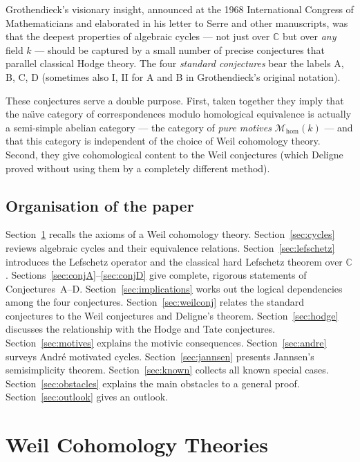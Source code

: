 \documentclass[12pt,a4paper]{amsart}
\theoremstyle{definition}
\begin{document}
Grothendieck's visionary insight, announced at the 1968 International Congress
of Mathematicians and elaborated in his letter to Serre and other manuscripts,
was that the deepest properties of algebraic cycles --- not just over
$\mathbb{C}$ but over \emph{any} field $k$ --- should be captured by a small
number of precise conjectures that parallel classical Hodge theory.
The four \emph{standard conjectures} bear the labels A, B, C, D (sometimes
also I, II for A and B in Grothendieck's original notation).

These conjectures serve a double purpose.  First, taken together they imply
that the na\"{\i}ve category of correspondences modulo homological equivalence
is actually a semi-simple abelian category --- the category of \emph{pure
motives} $\mathcal{M}_{\mathrm{hom}}(k)$ --- and that this category is
independent of the choice of Weil cohomology theory.  Second, they give
cohomological content to the Weil conjectures (which Deligne proved without
using them by a completely different method).

\subsection*{Organisation of the paper}

Section~\ref{sec:weil} recalls the axioms of a Weil cohomology theory.
Section~\ref{sec:cycles} reviews algebraic cycles and their equivalence
relations.  Section~\ref{sec:lefschetz} introduces the Lefschetz operator
and the classical hard Lefschetz theorem over $\mathbb{C}$.
Sections~\ref{sec:conjA}--\ref{sec:conjD} give complete, rigorous statements
of Conjectures~A--D.  Section~\ref{sec:implications} works out the
logical dependencies among the four conjectures.
Section~\ref{sec:weilconj} relates the standard conjectures to the Weil
conjectures and Deligne's theorem.  Section~\ref{sec:hodge} discusses the
relationship with the Hodge and Tate conjectures.
Section~\ref{sec:motives} explains the motivic consequences.
Section~\ref{sec:andre} surveys Andr\'e motivated cycles.
Section~\ref{sec:jannsen} presents Jannsen's semisimplicity theorem.
Section~\ref{sec:known} collects all known special cases.
Section~\ref{sec:obstacles} explains the main obstacles to a general proof.
Section~\ref{sec:outlook} gives an outlook.

\section{Weil Cohomology Theories}\label{sec:weil}
\end{document}
